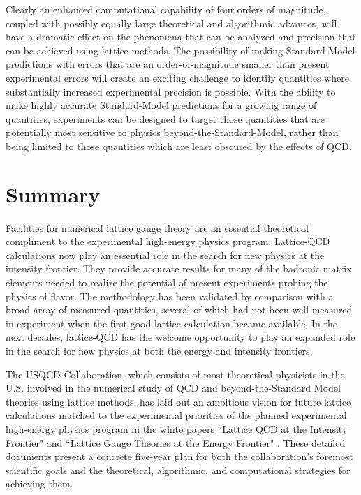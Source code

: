 Clearly an enhanced computational capability of four orders of magnitude,
coupled with possibly equally large theoretical and algorithmic advances, will
have a dramatic effect on the phenomena that can be analyzed and precision
that can be achieved using lattice methods.  The possibility of making
Standard-Model predictions with errors that are an order-of-magnitude smaller
than present experimental errors will create an exciting challenge to identify
quantities where substantially increased experimental precision is possible.
With the ability to make highly accurate Standard-Model predictions for a
growing range of quantities, experiments can be designed to target those
quantities that are potentially most sensitive to physics
beyond-the-Standard-Model, rather than being limited to those quantities which
are least obscured by the effects of QCD.

\section{Summary}
\label{sec:lqcd:summ}

Facilities for numerical lattice gauge theory are an essential theoretical compliment to the experimental
high-energy physics program.  Lattice-QCD calculations now play an essential role in the search for new physics at the intensity frontier.
They provide accurate results for many of the hadronic matrix elements needed to realize the potential of
present experiments probing the physics of flavor. The methodology has been validated by comparison 
with a broad array of measured quantities, several of which had not been well measured in experiment when the first good lattice calculation became available.  In the next decades, lattice-QCD has the welcome opportunity to play an expanded role in the search for new physics at both the energy and intensity frontiers.  

The USQCD Collaboration, which consists of most theoretical physicists in the U.S. involved in the numerical study of QCD and beyond-the-Standard Model theories using lattice methods, has laid out an ambitious vision for future lattice calculations matched to the experimental priorities of the planned experimental high-energy physics program in the white papers ``Lattice QCD at the Intensity Frontier" and ``Lattice Gauge Theories at the Energy Frontier" \cite{USQCD_IF_whitepaper13,USQCD_EF_whitepaper13}.  These detailed documents present a concrete five-year plan for both the collaboration's foremost scientific goals and the theoretical, algorithmic, and computational strategies for achieving them.

